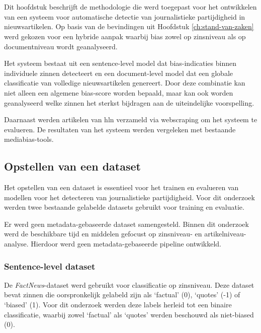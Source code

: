 \chapter{}
\label{ch:methodologie}

Dit hoofdstuk beschrijft de methodologie die werd toegepast voor het ontwikkelen van een systeem voor automatische detectie van journalistieke partijdigheid in nieuwsartikelen. Op basis van de bevindingen uit Hoofdstuk \ref{ch:stand-van-zaken} werd gekozen voor een hybride aanpak waarbij bias zowel op zinsniveau als op documentniveau wordt geanalyseerd.

Het systeem bestaat uit een sentence-level model dat bias-indicaties binnen individuele zinnen detecteert en een document-level model dat een globale classificatie van volledige nieuwsartikelen genereert. Door deze combinatie kan niet alleen een algemene bias-score worden bepaald, maar kan ook worden geanalyseerd welke zinnen het sterkst bijdragen aan de uiteindelijke voorspelling.

Daarnaast werden artikelen van \gls{hln} verzameld via webscraping om het systeem te evalueren. De resultaten van het systeem werden vergeleken met bestaande mediabias-tools.

\section{Opstellen van een dataset}
\label{sec:opstellen-van-een-dataset}

Het opstellen van een dataset is essentieel voor het trainen en evalueren van modellen voor het detecteren van journalistieke partijdigheid. Voor dit onderzoek werden twee bestaande gelabelde datasets gebruikt voor training en evaluatie.

Er werd geen metadata-gebaseerde dataset samengesteld. Binnen dit onderzoek werd de beschikbare tijd en middelen gefocust op zinsniveau- en artikelniveau-analyse. Hierdoor werd geen metadata-gebaseerde pipeline ontwikkeld.

\subsection{Sentence-level dataset}

De \textit{FactNews}-dataset \autocite{Vargas2024} werd gebruikt voor classificatie op zinsniveau. Deze dataset bevat zinnen die oorspronkelijk gelabeld zijn als `factual' (0), `quotes' (-1) of `biased' (1). Voor dit onderzoek werden deze labels herleid tot een binaire classificatie, waarbij zowel `factual' als `quotes' werden beschouwd als niet-biased (0).

